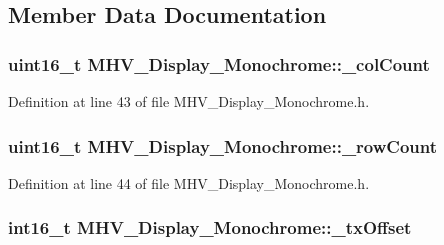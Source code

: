 \subsection{\-Member \-Data \-Documentation}
\hypertarget{class_m_h_v___display___monochrome_ae34bd61b8cffa2ee240bfe29f49a99d2}{
\subsubsection[{\-\_\-col\-Count}]{\setlength{\rightskip}{0pt plus 5cm}uint16\-\_\-t {\bf \-M\-H\-V\-\_\-\-Display\-\_\-\-Monochrome\-::\-\_\-col\-Count}}}
\label{class_m_h_v___display___monochrome_ae34bd61b8cffa2ee240bfe29f49a99d2}


\-Definition at line 43 of file \-M\-H\-V\-\_\-\-Display\-\_\-\-Monochrome.\-h.

\hypertarget{class_m_h_v___display___monochrome_a29a7a7b8ceaf0ce0087002b9458d5074}{
\subsubsection[{\-\_\-row\-Count}]{\setlength{\rightskip}{0pt plus 5cm}uint16\-\_\-t {\bf \-M\-H\-V\-\_\-\-Display\-\_\-\-Monochrome\-::\-\_\-row\-Count}}}
\label{class_m_h_v___display___monochrome_a29a7a7b8ceaf0ce0087002b9458d5074}


\-Definition at line 44 of file \-M\-H\-V\-\_\-\-Display\-\_\-\-Monochrome.\-h.

\hypertarget{class_m_h_v___display___monochrome_a75607cd77067ab059e8962e666593d4e}{
\subsubsection[{\-\_\-tx\-Offset}]{\setlength{\rightskip}{0pt plus 5cm}int16\-\_\-t {\bf \-M\-H\-V\-\_\-\-Display\-\_\-\-Monochrome\-::\-\_\-tx\-Offset}}}
\label{class_m_h_v___display___monochrome_a75607cd77067ab059e8962e666593d4e}


